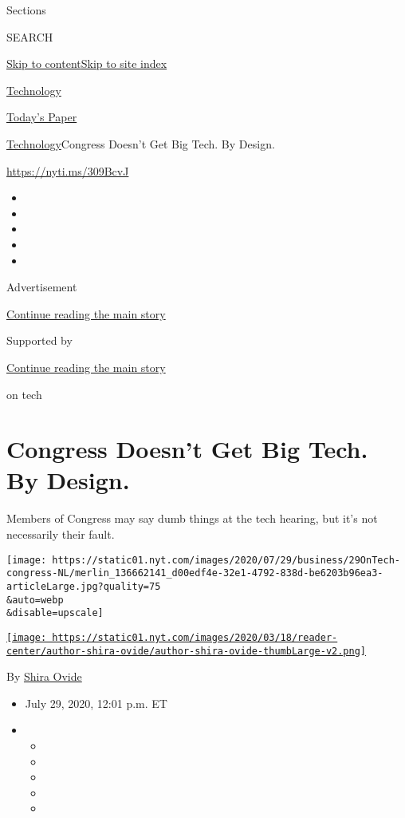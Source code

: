 Sections

SEARCH

\protect\hyperlink{site-content}{Skip to
content}\protect\hyperlink{site-index}{Skip to site index}

\href{https://www.nytimes.com/section/technology}{Technology}

\href{https://myaccount.nytimes.com/auth/login?response_type=cookie\&client_id=vi}{}

\href{https://www.nytimes.com/section/todayspaper}{Today's Paper}

\href{/section/technology}{Technology}\textbar{}Congress Doesn't Get Big
Tech. By Design.

\url{https://nyti.ms/309BcvJ}

\begin{itemize}
\item
\item
\item
\item
\item
\end{itemize}

Advertisement

\protect\hyperlink{after-top}{Continue reading the main story}

Supported by

\protect\hyperlink{after-sponsor}{Continue reading the main story}

on tech

\hypertarget{congress-doesnt-get-big-tech-by-design}{%
\section{Congress Doesn't Get Big Tech. By
Design.}\label{congress-doesnt-get-big-tech-by-design}}

Members of Congress may say dumb things at the tech hearing, but it's
not necessarily their fault.

\texttt{[image: https://static01.nyt.com/images/2020/07/29/business/29OnTech-congress-NL/merlin\_136662141\_d00edf4e-32e1-4792-838d-be6203b96ea3-articleLarge.jpg?quality=75\\\&auto=webp\\\&disable=upscale]}

\href{https://www.nytimes.com/by/shira-ovide}{\texttt{[image: https://static01.nyt.com/images/2020/03/18/reader-center/author-shira-ovide/author-shira-ovide-thumbLarge-v2.png]}}

By \href{https://www.nytimes.com/by/shira-ovide}{Shira Ovide}

\begin{itemize}
\item
  July 29, 2020, 12:01 p.m. ET
\item
  \begin{itemize}
  \item
  \item
  \item
  \item
  \item
  \end{itemize}
\end{itemize}

